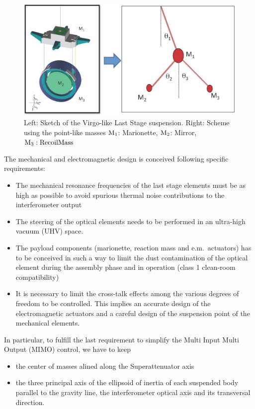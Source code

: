 \begin{figure}[t!]
	\begin{center}
		 \includegraphics[width=14cm]{Sec_Suspensions/Figures/LSS_branched.pdf}
			\caption{Left: Sketch of the Virgo-like Last Stage suspension. Right: Scheme using the point-like masses $\rm M_1$: Marionette, $\rm M_2$: Mirror, $\rm M_3: Recoil Mass$}		
			\label{LSSfig}
	\end{center}
\end{figure}

The mechanical and electromagnetic design is conceived following specific requirements:
\begin{itemize}
\item{The mechanical resonance frequencies of the last stage elements must be as high as possible to avoid spurious thermal noise contributions to the interferometer output}
\item{The steering of the optical elements needs to be performed in an ultra-high vacuum (UHV) space.}
\item{The payload components (marionette, reaction mass and e.m.\ actuators) has to be conceived in such a way to limit the dust contamination of the optical element during the assembly phase and in operation (class 1 clean-room compatibility)}
\item{It is necessary to limit the cross-talk effects among the various degrees of freedom to be controlled. This implies an accurate design of the electromagnetic actuators and a careful design of the suspension point of the mechanical elements. }
\end{itemize}

In particular, to fulfill the last requirement to simplify the  Multi Input Multi Output (MIMO)  control,  we have to keep

\begin{itemize}
\item{the center of masses alined along the Superattenuator axis}
\item{ the three principal axis of the ellipsoid of inertia of each suspended body parallel to the gravity line, the interferometer optical axis and its transversal direction.}
\end{itemize}

